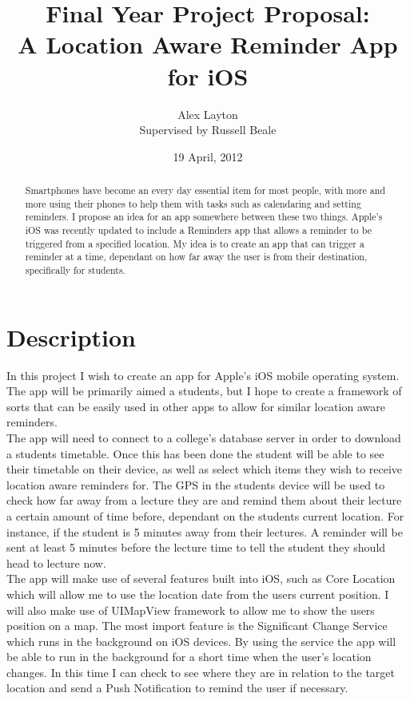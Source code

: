 \documentclass[12pt]{article}
\title{{\small Final Year Project Proposal:} \\ A Location Aware Reminder App for iOS}
\author{Alex Layton \\ {\small Supervised by Russell Beale}}
\date{19 April, 2012}
\begin{document}
\maketitle

\begin{abstract}
Smartphones have become an every day essential item for most people, with more and more using their phones to help them with tasks such as calendaring and setting reminders. I propose an idea for an app somewhere between these two things. Apple's iOS was recently updated to include a Reminders app that allows a reminder to be triggered from a specified location. My idea is to create an app that can trigger a reminder at a time, dependant on how far away the user is from their destination, specifically for students.     
\end{abstract}

\section*{Description}
In this project I wish to create an app for Apple's iOS mobile operating system. The app will be primarily aimed a students, but I hope to create a framework of sorts that can be easily used in other apps to allow for similar location aware reminders.\\ The app will need to connect to a college's database server in order to download a students timetable. Once this has been done the student will be able to see their timetable on their device, as well as select which items they wish to receive location aware reminders for. The GPS in the students device will be used to check how far away from a lecture they are and remind them about their lecture a certain amount of time before, dependant on the students current location. For instance, if the student is 5 minutes away from their lectures. A reminder will be sent at least 5 minutes before the lecture time to tell the student they should head to lecture now.\\ The app will make use of several features built into iOS, such as Core Location which will allow me to use the location date from the users current position. I will also make use of UIMapView framework to allow me to show the users position on a map. The most import feature is the Significant Change Service which runs in the background on iOS devices. By using the service the app will be able to run in the background for a short time when the user's location changes. In this time I can check to see where they are in relation to the target location and send a Push Notification to remind the user if necessary.
\end{document}
